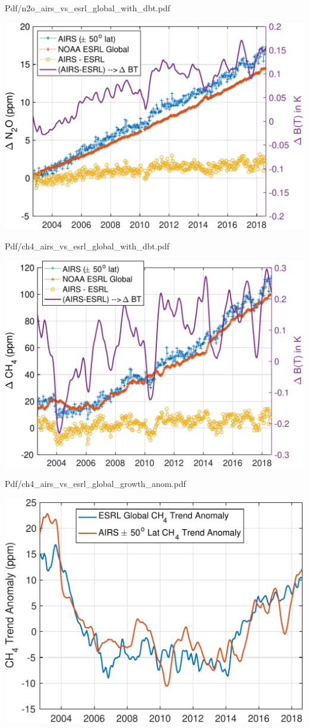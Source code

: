 \documentclass[10pt,t]{beamer}
\begin{document}
\begin{frame}[label={sec:org887d211}]{Pdf/n2o\_airs\_vs\_esrl\_global\_with\_dbt.pdf}
\begin{center}
\includegraphics[width=0.7\linewidth]{./Figs/Pdf/n2o_airs_vs_esrl_global_with_dbt.pdf}
\end{center}
\end{frame}

\begin{frame}[label={sec:org2a02afb}]{Pdf/ch4\_airs\_vs\_esrl\_global\_with\_dbt.pdf}
\begin{center}
\includegraphics[width=0.7\linewidth]{./Figs/Pdf/ch4_airs_vs_esrl_global_with_dbt.pdf}
\end{center}
\end{frame}

\begin{frame}[label={sec:org83a1df4}]{Pdf/ch4\_airs\_vs\_esrl\_global\_growth\_anom.pdf}
\begin{center}
\includegraphics[width=0.7\linewidth]{./Figs/Pdf/ch4_airs_vs_esrl_global_growth_anom.pdf}
\end{center}
\end{frame}
\end{document}
